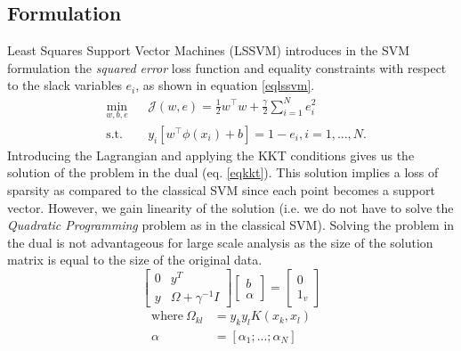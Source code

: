 \documentclass[conference, cmex10]{IEEEtran}
\begin{document}
\subsection{Formulation}
Least Squares Support Vector Machines (LSSVM) \cite{lssvmbook} \cite{Suykens1999} introduces in the SVM formulation the \textit{squared error} loss function and equality constraints with respect to the slack variables $e_i$, as shown in equation \ref{eqlssvm}. 
\begin{equation}\label{eqlssvm}
\begin{aligned}
& \underset{w,b,e}{\text{min}}
& & \mathcal{J}(w,e) = \frac{1}{2}w^{\intercal}w + \frac{\gamma}{2}\sum\limits_{i=1}^N e_{i}^2 \\
& \text{s.t.}
& & y_{i}[ w^{\intercal}\phi(x_{i})+b ] = 1 - e_{i}, i=1,\ldots ,N.
\end{aligned}
\end{equation}
Introducing the Lagrangian and applying the KKT conditions gives us the solution of the problem in the dual (eq. \ref{eqkkt}). This solution implies a loss of sparsity as compared to the classical SVM since each point becomes a support vector. However, we gain linearity of the solution (i.e. we do not have to solve the \textit{Quadratic Programming} problem as in the classical SVM). Solving the problem in the dual is not advantageous for large scale analysis as the size of the solution matrix is equal to the size of the original data.  
\begin{equation}
\label{eqkkt}
\left[\begin{array}{c|c}
   0  & y^T   \\ \hline
   y & \Omega + \gamma^{-1} \mathit{I} 
\end{array}\right] 
\left[\begin{array}{c}
   b    \\ \hline
   \alpha  
\end{array}\right] = \left[\begin{array}{c}
   0    \\ \hline
   1_v  
\end{array}\right] 
\end{equation}
\begin{align*}
\text{where} \ \Omega_{kl} &= y_{k}y_{l}K(x_{k}, x_{l}) \\
\alpha &= \left[\alpha_1 ; ... ; \alpha_N \right]
\end{align*}
\end{document}
